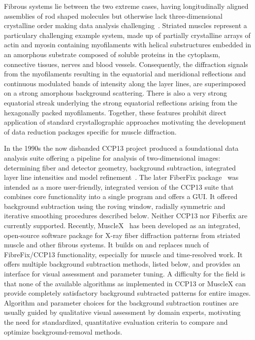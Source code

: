 \documentclass[iucr]{iucrjournals}
\begin{document}
Fibrous systems lie between the two extreme cases, having longitudinally aligned assemblies of rod shaped molecules but otherwise lack three-dimensional crystalline order making data analysis challenging~\cite{Fraser_a13879}. Striated muscles represent a particulary challenging example system, made up of partially crystalline arrays of actin and myosin containing myofilaments with helical substructures embedded in an amorphous substrate composed of soluble proteins in the cytoplasm, connective tissues, nerves and blood vessels. Consequently, the diffraction signals from the myofilaments resulting in the equatorial and meridional reflections and continuous modulated bands of intensity along the layer lines, are superimposed on a strong amorphous background scattering. There is also a very strong equatorial streak underlying the strong equatorial reflections arising from the hexagonally packed myofilaments. Together, these features prohibit direct application of standard crystallographic approaches motivating the development of data reduction packages specific for muscle diffraction. 

In the 1990s the now disbanded CCP13 project produced a foundational data analysis suite offering a pipeline for analysis of two-dimensional images: determining fiber and detector geometry, background subtraction, integrated layer line intensities and model refinement~\cite{squire2003ccp13_software, shotton1998ccp13_software_dev, denny1995ccp13_updates}. The later FiberFix package~\cite{HeEtAl2007} was intended as a more user-friendly, integrated version of the CCP13 suite that combines core functionality into a single program and offers a GUI. It offered background subtraction using the roving window, radially symmetric and iterative smoothing procedures described below. Neither CCP13 nor Fiberfix are currently supported. Recently, MuscleX~\cite{JiratrakanvongEtAl2024} has been developed as an integrated, open-source software package for X-ray fiber diffraction patterns from striated muscle and other fibrous systems. It builds on and replaces much of FibreFix/CCP13 functionality, especially for muscle and time-resolved work. It offers multiple background subtraction methods, listed below, and provides an interface for visual assessment and parameter tuning. A difficulty for the field is that none of the available algorithms as implemented in CCP13 or MuscleX can provide completely satisfactory background subtracted patterns for entire images. Algorithm and parameter choices for the background subtraction routines are usually guided by qualitative visual assessment by domain experts, motivating the need for standardized, quantitative evaluation criteria to compare and optimize background-removal methods.
\end{document}
